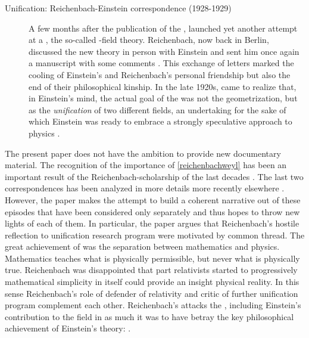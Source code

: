 \documentclass[draft]{article}
\newcommand{\PRZL}{\citetitle{Reichenbach1928}\xspace}
\newcommand{\FP}{\german{Fernparallelismus}\xspace}
\begin{document}
\begin{description}
\item[Unification: Reichenbach-Einstein correspondence (1928-1929)]\label{reichenbacheinsteinII}   A few months after the publication of the \PRZL \citep{Reichenbach1928}, \citet{Einstein19281,Einstein19282} launched yet another attempt at a \uft, the so-called \FP-field theory. Reichenbach, now back in Berlin, discussed the new theory in person with Einstein and sent him once again a manuscript with some comments \citep{Reichenbach1928b}. This exchange of letters marked the cooling of Einstein's and Reichenbach's personal friendship but also the end of their philosophical kinship. In the late 1920s, \citet{Reichenbach1929a,Reichenbach1929b,Reichenbach1929c} came to realize that, in Einstein's mind, the actual goal of the \uftp was not the geometrization, but as the \emph{unification} of two different fields, an undertaking for the sake of which Einstein was ready to embrace a strongly speculative approach to physics \citep{Dongen2010}.  
\end{description}

The present paper does not have the ambition to provide new documentary material. The recognition of the importance of \cref{reichenbachweyl} has been an important result of the Reichenbach-scholarship of the last decades \citep{Ryckman1995,Ryckman1996}. The last two correspondences has been analyzed in more details more recently elsewhere \citep{Giovanelli2016d,Giovanelli2022}. However, the paper makes the attempt to build a coherent narrative out of these episodes that have been considered only separately and thus hopes to throw new lights of each of them. In particular, the paper argues that Reichenbach's hostile reflection to unification research program were motivated by common thread. The great achievement of \gr was the separation between mathematics and physics. Mathematics teaches what is physically permissible, but never what is physically true. Reichenbach was disappointed  that part relativists started to progressively mathematical simplicity in itself could provide an insight physical reality. In this sense Reichenbach's role of defender of relativity and critic of further unification program complement each other. Reichenbach's attacks the \uftp, including Einstein's contribution to the field in as much it was to have betray the key philosophical achievement of Einstein's theory:  \citep[11]{Reichenbach1929}.   
\end{document}
